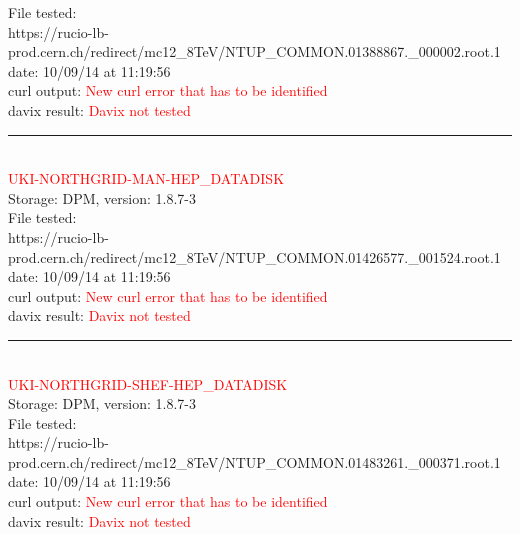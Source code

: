 File tested:\\
\footnotesize{https://rucio-lb-prod.cern.ch/redirect/mc12\_8TeV/NTUP\_COMMON.01388867.\_000002.root.1}\\

date: 10/09/14 at 11:19:56\\

curl output:  \textcolor{red}{New curl error that has to be identified}\\

davix result:  \textcolor{red}{Davix not tested}\\

\rule{\textwidth}{1pt}\\

\textcolor{red}{\normalsize{UKI-NORTHGRID-MAN-HEP\_DATADISK}}\\

Storage: DPM, version: 1.8.7-3\\

File tested:\\
\footnotesize{https://rucio-lb-prod.cern.ch/redirect/mc12\_8TeV/NTUP\_COMMON.01426577.\_001524.root.1}\\

date: 10/09/14 at 11:19:56\\

curl output:  \textcolor{red}{New curl error that has to be identified}\\

davix result:  \textcolor{red}{Davix not tested}\\

\rule{\textwidth}{1pt}\\

\textcolor{red}{\normalsize{UKI-NORTHGRID-SHEF-HEP\_DATADISK}}\\

Storage: DPM, version: 1.8.7-3\\

File tested:\\
\footnotesize{https://rucio-lb-prod.cern.ch/redirect/mc12\_8TeV/NTUP\_COMMON.01483261.\_000371.root.1}\\

date: 10/09/14 at 11:19:56\\

curl output:  \textcolor{red}{New curl error that has to be identified}\\

davix result:  \textcolor{red}{Davix not tested}\\

